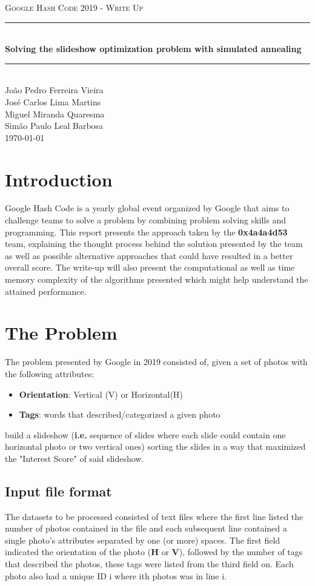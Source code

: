 \documentclass{article}
\newcommand{\titleRule}{
    \rule{\linewidth}{0.5mm} \\ [0.25cm]
}
\begin{document}
\begin{titlepage}
    \center
    \textsc{\LARGE Google Hash Code 2019 - Write Up} \\ [1.5cm]
    \titleRule
    {\huge \bfseries Solving the slideshow optimization problem with simulated annealing}
    \titleRule

    João Pedro Ferreira Vieira \\
    José Carlos Lima Martins \\
    Miguel Miranda Quaresma \\
    Simão Paulo Leal Barbosa \\[0.25cm]

    \today
\end{titlepage}

\section{Introduction}

Google Hash Code is a yearly global event organized by Google that aims to challenge teams to solve a problem by combining problem solving 
skills and programming. 
This report presents the approach taken by the \textbf{0x4a4a4d53} team, explaining the thought process behind the solution presented by the
team as well as possible alternative approaches that could have resulted in a better overall score.
The write-up will also present the computational as well as time memory complexity of the algorithms presented which might help understand
the attained performance.

\section{The Problem}
The problem presented by Google in 2019 consisted of, given a set of photos with the following attributes:
\begin{itemize}
    \item \textbf{Orientation}: Vertical (V) or Horizontal(H)
    \item \textbf{Tags}: words that described/categorized a given photo
\end{itemize}

build a slideshow (\textbf{i.e.} sequence of slides where each slide could contain one horizontal photo or two vertical ones) sorting the
slides in a way that maximized the "Interest Score" of said slideshow.

\subsection{Input file format}
The datasets to be processed consisted of text files where the first line listed the number of photos contained in the file and each subsequent
line contained a single photo's attributes separated by one (or more) spaces.
The first field indicated the orientation of the photo (\textbf{H} or \textbf{V}), followed by the number of tags that described the photos, these 
tags were listed from the third field on. Each photo also had a unique ID i where ith photos was in line i.
\end{document}
